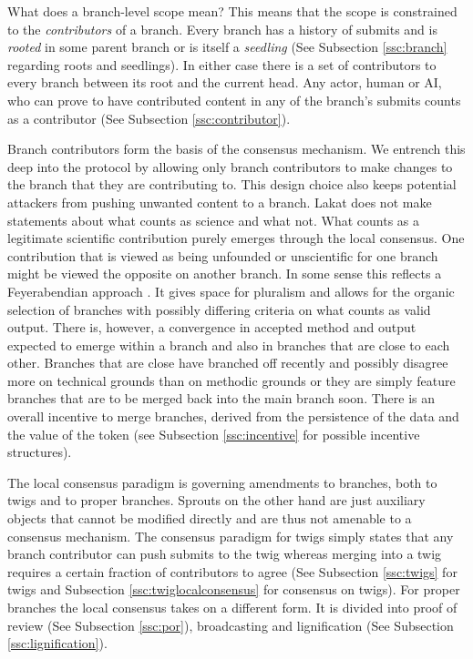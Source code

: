 What does a branch-level scope mean? This means that the scope is constrained to the \textit{contributors} of a branch. Every branch has a history of submits and is \textit{rooted} in some parent branch or is itself a \textit{seedling} (See Subsection \ref{ssc:branch} regarding roots and seedlings). In either case there is a set of contributors to every branch between its root and the current head. Any actor, human or AI, who can prove to have contributed content in any of the branch's submits counts as a contributor (See Subsection \ref{ssc:contributor}). 

Branch contributors form the basis of the consensus mechanism. We entrench this deep into the protocol by allowing only branch contributors to make changes to the branch that they are contributing to. This design choice also keeps potential attackers from pushing unwanted content to a branch. Lakat does not make statements about what counts as science and what not. What counts as a legitimate scientific contribution purely emerges through the local consensus. One contribution that is viewed as being unfounded or unscientific for one branch might be viewed the opposite on another branch. In some sense this reflects a Feyerabendian approach \cite{}. It gives space for pluralism and allows for the organic selection of branches with possibly differing criteria on what counts as valid output. There is, however, a convergence in accepted method and output expected to emerge within a branch and also in branches that are close to each other. Branches that are close have branched off recently and possibly disagree more on technical grounds than on methodic grounds or they are simply feature branches that are to be merged back into the main branch soon. There is an overall incentive to merge branches, derived from the persistence of the data and the value of the token (see Subsection \ref{ssc:incentive} for possible incentive structures). 

The local consensus paradigm is governing amendments to branches, both to twigs and to proper branches. Sprouts on the other hand are just auxiliary objects that cannot be modified directly and are thus not amenable to a consensus mechanism. The consensus paradigm for twigs simply states that any branch contributor can push submits to the twig whereas merging into a twig requires a certain fraction of contributors to agree (See Subsection \ref{ssc:twigs} for twigs and Subsection \ref{ssc:twiglocalconsensus} for consensus on twigs). For proper branches the local consensus takes on a different form. It is divided into proof of review (See Subsection \ref{ssc:por}), broadcasting and lignification (See Subsection \ref{ssc:lignification}).

